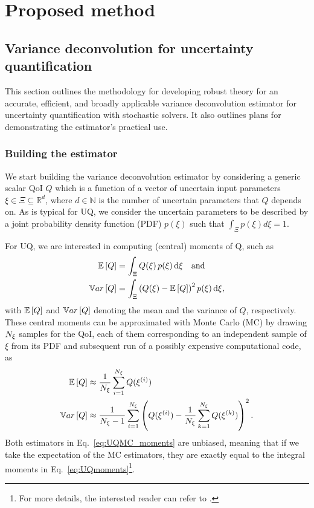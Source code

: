 \chapter{Proposed method} \label{ch-method}

\section{Variance deconvolution for uncertainty quantification}
This section outlines the methodology for developing robust theory for an accurate, efficient, and broadly applicable variance deconvolution estimator for uncertainty quantification with stochastic solvers. It also outlines plans for demonstrating the estimator's practical use. 

\subsection{Building the estimator}
We start building the variance deconvolution estimator by considering a generic scalar QoI $Q$ which is a function of a vector of uncertain input parameters $\xi \in \Xi \subseteq \mathbb{R}^d$, where $d \in \mathbb{N}$ is the number of uncertain parameters that $Q$ depends on. As is typical for UQ, we consider the uncertain parameters to be described by a joint probability density function (PDF) $p(\xi)$ such that $\int_\Xi p(\xi) d\xi = 1$.

For UQ, we are interested in computing (central) moments of Q, such as
\begin{equation}\label{eq:UQmoments}
    \begin{split}
        \mathbb{E}\left[Q\right]  &= \int_\Xi{ Q(\xi) \, p(\xi) \, \mathrm{d}\xi  } \quad \mathrm{and} \\
        \mathbb{V}ar\left[Q\right] &= \int_\Xi{ \left( Q(\xi) - \mathbb{E}\left[Q\right] \right)^2 p(\xi) \, \mathrm{d}\xi  },
    \end{split}
\end{equation}
with $\mathbb{E}\left[Q\right]$ and $\mathbb{V}ar\left[Q\right]$ denoting the mean and the variance of $Q$, respectively. These central moments can be approximated with Monte Carlo (MC) by drawing ${N_\xi}$ samples for the QoI, each of them corresponding to an independent sample of $\xi$ from its PDF and subsequent run of a possibly expensive computational code, as
\begin{equation} \label{eq:UQMC_moments}
\begin{split}
 \mathbb{E}\left[Q\right]  &\approx \frac{1}{{N_\xi}} \sum_{i=1}^{{N_\xi}} Q( \xi^{(i)} )  \\
 \mathbb{V}ar\left[Q\right] &\approx \frac{1}{{N_\xi}-1} \sum_{i=1}^{{N_\xi}} \left(Q( \xi^{(i)} ) - \frac{1}{{N_\xi}} \sum_{k=1}^{{N_\xi}} Q(\xi^{(k)})\right)^2.
 \end{split}
\end{equation}
Both estimators in Eq.~\eqref{eq:UQMC_moments} are unbiased, meaning that if we take the expectation of the MC estimators, they are exactly equal to the integral moments in Eq.~\eqref{eq:UQmoments}\footnote{For more details, the interested reader can refer to \cite{Owen}.}. 

